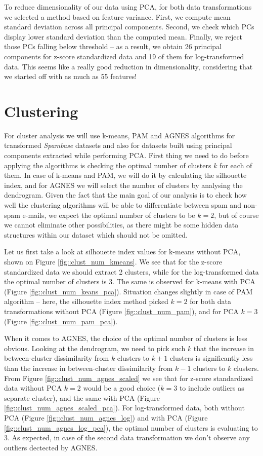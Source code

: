\documentclass{article}
\begin{document}
	To reduce dimensionality of our data using PCA, for both data transformations we selected a method based on feature variance. First, we compute
	mean standard deviation across all principal components. Second, we check which PCs display lower standard deviation than the computed mean. Finally,
	we reject those PCs falling below threshold -- as a result, we obtain 26 principal components for z-score standardized data and 19 of them for log-transformed data.
	This seems like a really good reduction in dimensionality, considering that we started off with as much as 55 features! 
	
	\section{Clustering}
	\label{section::clustering}
	For cluster analysis we will use k-means, PAM and AGNES algorithms for transformed \textit{Spambase} datasets and also for datasets built using principal components extracted while performing PCA. 
	First thing we need to do before applying the algorithms is checking the optimal number of clusters $k$ for each of them.
	In case of k-means and PAM, we will do it by calculating the silhouette index, and for AGNES we will select the number of clusters by analysing the dendrogram.
	Given the fact that the main goal of our analysis is to check how well the clustering algorithms will be able to differentiate between spam and non-spam e-mails,
	we expect the optimal number of clusters to be $k=2$, but of course we cannot eliminate other possibilities, as there might be some hidden data structures within our 
	dataset which should not be omitted.
	
	Let us first take a look at silhouette index values for k-means without PCA, shown on Figure \ref{fig::clust_num_kmeans}. We see that for the z-score standardized
	data we should extract 2 clusters, while for the log-transformed data the optimal number of clusters is 3. The same is observed for k-means with PCA (Figure \ref{fig::clust_num_keans_pca}).
	Situation changes slightly in case of PAM algorithm -- here, the silhouette index method picked $k=2$ for both data transformations without PCA (Figure \ref{fig::clust_num_pam}),
	and for PCA $k=3$ (Figure \ref{fig::clust_num_pam_pca}).

	When it comes to AGNES, the choice of the optimal number of clusters is less obvious. Looking at the dendrogram, we need to pick such $k$ that the increase
	in between-cluster dissimilarity from $k$ clusters to $k+1$ clusters is significantly less than the increase in between-cluster dissimilarity from $k-1$ clusters to $k$ clusters.
	From Figure \ref{fig::clust_num_agnes_scaled} we see that for z-score standardized data without PCA $k=2$ would be a good choice ($k=3$ to include outliers as separate cluster),
	and the same with PCA (Figure \ref{fig::clust_num_agnes_scaled_pca}). For log-transformed data, both without PCA (Figure \ref{fig::clust_num_agnes_log}) and with PCA
	(Figure \ref{fig::clust_num_agnes_log_pca}), the optimal number of clusters is evaluating to 3. As expected, in case of the second data transformation we don't observe any outliers dectected by AGNES.
\end{document}
